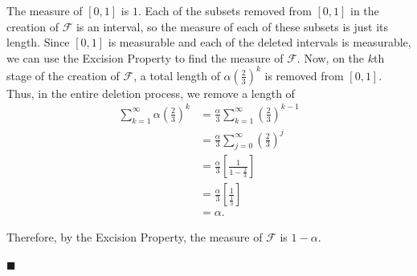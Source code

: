 \documentclass[12pt]{article}
\begin{document}
\noindent The measure of $[0,1]$ is $1$. Each of the subsets removed from $[0,1]$ in the creation of $\mathcal{F}$ is an interval, so the measure of each of these subsets is just its length. Since $[0,1]$ is measurable and each of the deleted intervals is measurable, we can use the Excision Property to find the measure of $\mathcal{F}$. Now, on the $k$th stage of the creation of $\mathcal{F}$, a total length of $\alpha\left(\frac{2}{3}\right)^k$ is removed from $[0,1]$. Thus, in the entire deletion process, we remove a length of
\begin{align*}
    \sum\limits_{k=1}^{\infty}\alpha\left(\frac{2}{3}\right)^k &= \frac{\alpha}{3}\sum\limits_{k=1}^{\infty}\left(\frac{2}{3}\right)^{k-1} \\
    &=\frac{\alpha}{3}\sum\limits_{j=0}^{\infty}\left(\frac{2}{3}\right)^j \\
    &= \frac{\alpha}{3}\left[\frac{1}{1-\frac{2}{3}}\right] \\
    &=\frac{\alpha}{3}\left[\frac{1}{\frac{1}{3}}\right] \\
    &= \alpha.
\end{align*}

\noindent Therefore, by the Excision Property, the measure of $\mathcal{F}$ is $1-\alpha.$

\hfill$\blacksquare$
\end{document}
